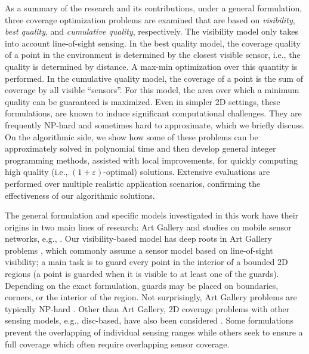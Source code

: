 As a summary of the research and its contributions, under a general formulation, three coverage optimization problems are examined that are based on \emph{visibility}, \emph{best quality}, and \emph{cumulative quality}, respectively. The visibility model only takes into account line-of-sight sensing. In the best quality model, the coverage quality of a point in the environment is determined by the closest visible sensor, i.e., the quality is determined by distance. A max-min optimization over this quantity is performed. In the cumulative quality model, the coverage of a point is the sum of coverage by all visible ``sensors''. For this model, the area over which a minimum quality can be guaranteed is maximized. Even in simpler 2D settings, these formulations, are known to induce significant computational challenges. They are frequently NP-hard and sometimes hard to approximate, which we briefly discuss. On the algorithmic side, we show how some of these problems can be approximately solved in polynomial time and then develop general integer programming methods, assisted with local improvements, for quickly computing high quality (i.e., $(1+\varepsilon)$-optimal) solutions. Extensive evaluations are performed over multiple realistic application scenarios, confirming the effectiveness of our algorithmic solutions. 

The general formulation and specific models investigated in this work have their origins in two main lines of research: Art Gallery \cite{o1987art,shermer1992recent,o2017visibility} and studies on mobile sensor networks, e.g., \cite{howard2002mobile,cortes2004coverage,martinez2007motion,krause2008near,schwager2009decentralized,hollinger2013sampling}. Our visibility-based model has deep roots in Art Gallery problems \cite{o1987art,shermer1992recent,o2017visibility}, which commonly assume a sensor model based on line-of-sight visibility\cite{lozano1979algorithm}; a main task is to guard every point in the interior of a bounded 2D regions (a point is guarded when it is visible to at least one of the guards). Depending on the exact formulation, guards may be placed on boundaries, corners, or the interior of the region. Not surprisingly, Art Gallery problems are typically NP-hard \cite{lee1986computational}. Other than Art Gallery, 2D coverage problems with other sensing models, e.g., disc-based, have also been considered \cite{thue1910dichteste,hales2005proof,drezner1995facility,cortes2004coverage,pavone2009equitable,pierson2017adapting}. Some formulations prevent the overlapping of individual sensing ranges \cite{thue1910dichteste,hales2005proof} while others seek to ensure a full coverage which often require overlapping sensor coverage.

